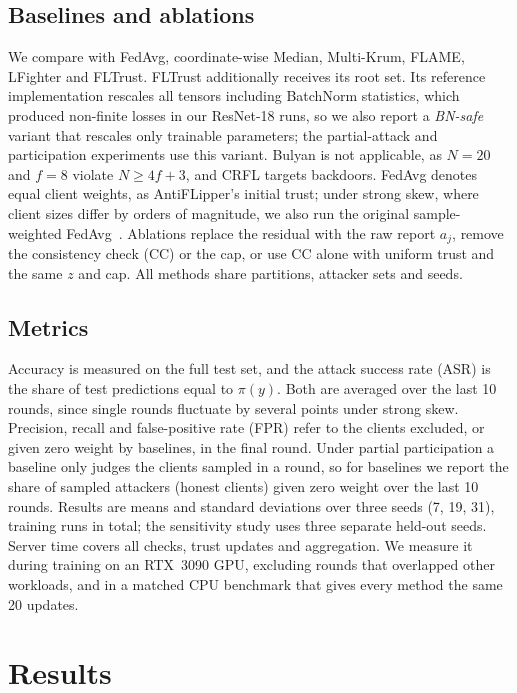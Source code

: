 \documentclass[journal]{IEEEtran}
\begin{document}
\subsection{Baselines and ablations}
We compare with FedAvg, coordinate-wise Median, Multi-Krum, FLAME, LFighter and FLTrust. FLTrust additionally receives its root set. Its reference implementation rescales all tensors including BatchNorm statistics, which produced non-finite losses in our ResNet-18 runs, so we also report a \emph{BN-safe} variant that rescales only trainable parameters; the partial-attack and participation experiments use this variant. Bulyan is not applicable, as $N{=}20$ and $f{=}8$ violate $N\ge4f+3$, and CRFL targets backdoors. FedAvg denotes equal client weights, as AntiFLipper's initial trust; under strong skew, where client sizes differ by orders of magnitude, we also run the original sample-weighted FedAvg~\cite{fedavg-pmlr-v54-mcmahan17a}. Ablations replace the residual with the raw report $a_j$, remove the consistency check (CC) or the cap, or use CC alone with uniform trust and the same $z$ and cap. All methods share partitions, attacker sets and seeds.

\subsection{Metrics}
Accuracy is measured on the full test set, and the attack success rate (ASR) is the share of test predictions equal to $\pi(y)$. Both are averaged over the last 10 rounds, since single rounds fluctuate by several points under strong skew. Precision, recall and false-positive rate (FPR) refer to the clients excluded, or given zero weight by baselines, in the final round. Under partial participation a baseline only judges the clients sampled in a round, so for baselines we report the share of sampled attackers (honest clients) given zero weight over the last 10 rounds. Results are means and standard deviations over three seeds (7, 19, 31), \nRuns{} training runs in total; the sensitivity study uses three separate held-out seeds. Server time covers all checks, trust updates and aggregation. We measure it during training on an RTX~3090 GPU, excluding rounds that overlapped other workloads, and in a matched CPU benchmark that gives every method the same 20 updates.

\section{Results}
\label{sec:results}


\end{document}
